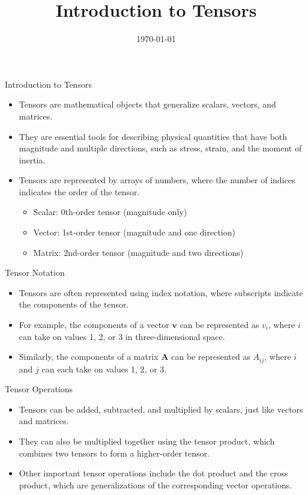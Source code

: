\documentclass{beamer}
\title{Introduction to Tensors}
\date{\today}
\begin{document}
\frame{\titlepage}

\begin{frame}{Introduction to Tensors}
    \begin{itemize}
        \item Tensors are mathematical objects that generalize scalars, vectors, and matrices. 
        \item They are essential tools for describing physical quantities that have both magnitude and multiple directions, such as stress, strain, and the moment of inertia.
        \item Tensors are represented by arrays of numbers, where the number of indices indicates the order of the tensor. 
        \begin{itemize}
            \item Scalar: 0th-order tensor (magnitude only) 
            \item Vector: 1st-order tensor (magnitude and one direction) 
            \item Matrix: 2nd-order tensor (magnitude and two directions) 
        \end{itemize}
    \end{itemize}
\end{frame}

\begin{frame}{Tensor Notation}
    \begin{itemize}
        \item Tensors are often represented using index notation, where subscripts indicate the components of the tensor. 
        \item For example, the components of a vector $\mathbf{v}$ can be represented as $v_i$, where $i$ can take on values 1, 2, or 3 in three-dimensional space. 
        \item Similarly, the components of a matrix $\mathbf{A}$ can be represented as $A_{ij}$, where $i$ and $j$ can each take on values 1, 2, or 3. 
    \end{itemize}
\end{frame}

\begin{frame}{Tensor Operations}
    \begin{itemize}
        \item Tensors can be added, subtracted, and multiplied by scalars, just like vectors and matrices. 
        \item They can also be multiplied together using the tensor product, which combines two tensors to form a higher-order tensor. 
        \item Other important tensor operations include the dot product and the cross product, which are generalizations of the corresponding vector operations. 
    \end{itemize}
\end{frame}
\end{document}
